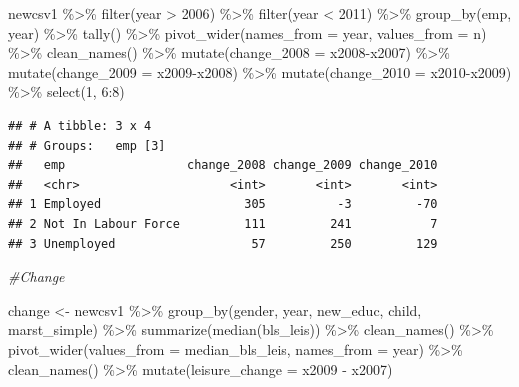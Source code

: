\documentclass[
]{article}
\newenvironment{Shaded}{\begin{snugshade}}{\end{snugshade}}
\newcommand{\AttributeTok}[1]{\textcolor[rgb]{0.77,0.63,0.00}{#1}}
\newcommand{\CommentTok}[1]{\textcolor[rgb]{0.56,0.35,0.01}{\textit{#1}}}
\newcommand{\DecValTok}[1]{\textcolor[rgb]{0.00,0.00,0.81}{#1}}
\newcommand{\FunctionTok}[1]{\textcolor[rgb]{0.00,0.00,0.00}{#1}}
\newcommand{\NormalTok}[1]{#1}
\newcommand{\OtherTok}[1]{\textcolor[rgb]{0.56,0.35,0.01}{#1}}
\newcommand{\SpecialCharTok}[1]{\textcolor[rgb]{0.00,0.00,0.00}{#1}}
\begin{document}
\begin{Shaded}
\begin{Highlighting}[]
\NormalTok{newcsv1 }\SpecialCharTok{\%\textgreater{}\%}
  \FunctionTok{filter}\NormalTok{(year }\SpecialCharTok{\textgreater{}} \DecValTok{2006}\NormalTok{) }\SpecialCharTok{\%\textgreater{}\%}
  \FunctionTok{filter}\NormalTok{(year }\SpecialCharTok{\textless{}} \DecValTok{2011}\NormalTok{) }\SpecialCharTok{\%\textgreater{}\%}
  \FunctionTok{group\_by}\NormalTok{(emp, year) }\SpecialCharTok{\%\textgreater{}\%}
  \FunctionTok{tally}\NormalTok{() }\SpecialCharTok{\%\textgreater{}\%}
  \FunctionTok{pivot\_wider}\NormalTok{(}\AttributeTok{names\_from =}\NormalTok{ year, }\AttributeTok{values\_from =}\NormalTok{ n) }\SpecialCharTok{\%\textgreater{}\%}
  \FunctionTok{clean\_names}\NormalTok{() }\SpecialCharTok{\%\textgreater{}\%}
  \FunctionTok{mutate}\NormalTok{(}\AttributeTok{change\_2008 =}\NormalTok{ x2008}\SpecialCharTok{{-}}\NormalTok{x2007) }\SpecialCharTok{\%\textgreater{}\%}
  \FunctionTok{mutate}\NormalTok{(}\AttributeTok{change\_2009 =}\NormalTok{ x2009}\SpecialCharTok{{-}}\NormalTok{x2008) }\SpecialCharTok{\%\textgreater{}\%}
  \FunctionTok{mutate}\NormalTok{(}\AttributeTok{change\_2010 =}\NormalTok{ x2010}\SpecialCharTok{{-}}\NormalTok{x2009) }\SpecialCharTok{\%\textgreater{}\%}
  \FunctionTok{select}\NormalTok{(}\DecValTok{1}\NormalTok{, }\DecValTok{6}\SpecialCharTok{:}\DecValTok{8}\NormalTok{)}
\end{Highlighting}
\end{Shaded}

\begin{verbatim}
## # A tibble: 3 x 4
## # Groups:   emp [3]
##   emp                 change_2008 change_2009 change_2010
##   <chr>                     <int>       <int>       <int>
## 1 Employed                    305          -3         -70
## 2 Not In Labour Force         111         241           7
## 3 Unemployed                   57         250         129
\end{verbatim}

\begin{Shaded}
\begin{Highlighting}[]
\CommentTok{\#Change}

\NormalTok{change }\OtherTok{\textless{}{-}}\NormalTok{ newcsv1 }\SpecialCharTok{\%\textgreater{}\%}
  \FunctionTok{group\_by}\NormalTok{(gender,  year, new\_educ, child, marst\_simple) }\SpecialCharTok{\%\textgreater{}\%}
  \FunctionTok{summarize}\NormalTok{(}\FunctionTok{median}\NormalTok{(bls\_leis)) }\SpecialCharTok{\%\textgreater{}\%}
  \FunctionTok{clean\_names}\NormalTok{() }\SpecialCharTok{\%\textgreater{}\%}
  \FunctionTok{pivot\_wider}\NormalTok{(}\AttributeTok{values\_from =}\NormalTok{ median\_bls\_leis, }\AttributeTok{names\_from =}\NormalTok{ year) }\SpecialCharTok{\%\textgreater{}\%}
  \FunctionTok{clean\_names}\NormalTok{() }\SpecialCharTok{\%\textgreater{}\%}
  \FunctionTok{mutate}\NormalTok{(}\AttributeTok{leisure\_change =}\NormalTok{ x2009 }\SpecialCharTok{{-}}\NormalTok{ x2007)}
\end{Highlighting}
\end{Shaded}
\end{document}
